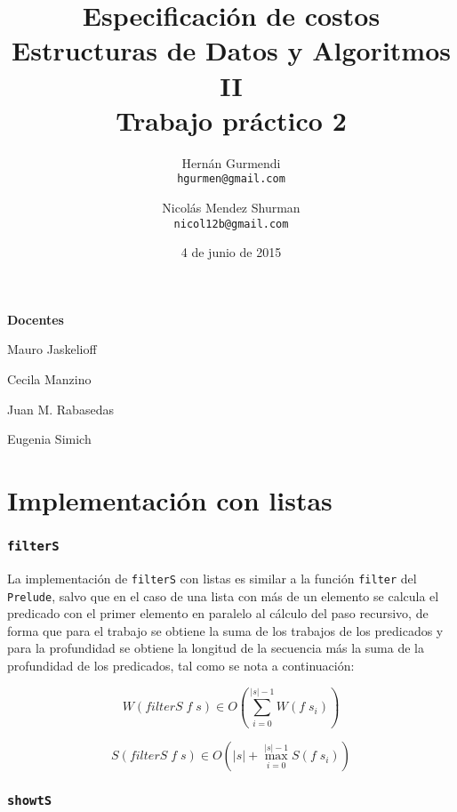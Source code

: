 \documentclass[a4paper,10pt]{article}
\author{
    Hernán Gurmendi \\
    \texttt{hgurmen@gmail.com}
    \and Nicolás Mendez Shurman \\
    \texttt{nicol12b@gmail.com}
}
\date{
    4 de junio de 2015
}
\title{
    \Huge Especificación de costos \\
    \Large Estructuras de Datos y Algoritmos II \\
    \large Trabajo práctico 2
}
\begin{document}
\maketitle

\begin{center}
\large \bf Docentes
\end{center}

\begin{center}
Mauro Jaskelioff

Cecila Manzino

Juan M. Rabasedas

Eugenia Simich
\end{center}

\newpage{}


\part*{Implementación con listas}


\section*{\texttt{filterS}}

La implementación de \texttt{filterS} con listas es similar a la función \texttt{filter}
del \texttt{Prelude}, salvo que en el caso de una lista con más de un elemento se
calcula el predicado con el primer elemento en paralelo al cálculo del paso
recursivo, de forma que para el trabajo se obtiene la suma de los trabajos de los
predicados y para la profundidad se obtiene la longitud de la secuencia más la suma
de la profundidad de los predicados, tal como se nota a continuación:


\begin{equation*}
    W \left( filterS\; f \; s \right) \in
    O \left( \sum_{i=0}^{\vert s \vert -1} W \left( f \; s_i \right) \right)
\end{equation*}

\begin{equation*}
    S \left( filterS\; f \; s \right) \in
    O \left( \vert s \vert + \max_{i=0}^{\vert s \vert -1} S \left( f \; s_i \right) \right)
\end{equation*}


\section*{\texttt{showtS}}
\end{document}
